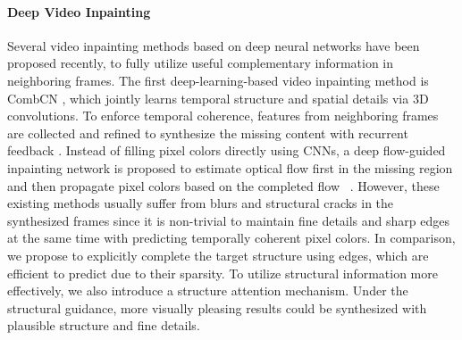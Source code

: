 \paragraph{Deep Video Inpainting}
Several video inpainting methods based on deep neural networks have been proposed recently, to fully utilize useful complementary information in neighboring frames.
%
The first deep-learning-based video inpainting method is CombCN \cite{wang2019video}, which jointly learns temporal structure and spatial details via 3D convolutions.
%
To enforce temporal coherence, features from neighboring frames are collected and refined to synthesize the missing content with recurrent feedback \cite{Kim_2019_CVPR1,Kim_2019_CVPR}. 
Instead of filling pixel colors directly using CNNs, a deep flow-guided inpainting network is proposed to estimate optical flow first in the missing region and then propagate pixel colors based on the completed flow ~\cite{Xu_2019_CVPR}.
However, these existing methods usually suffer from blurs and structural cracks in the synthesized frames since it is non-trivial to maintain fine details and sharp edges at the same time with predicting temporally coherent pixel colors. 
In comparison, we propose to explicitly complete the target structure using edges, which are efficient to predict due to their sparsity. To utilize structural information more effectively, we also introduce a structure attention mechanism. 
Under the structural guidance, more visually pleasing results could be synthesized with plausible structure and fine details. 


